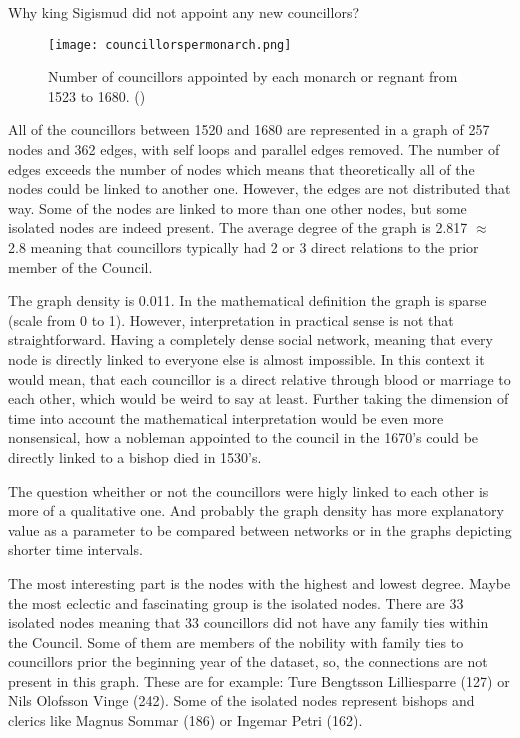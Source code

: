 Why king Sigismud did not appoint any new councillors? 

\begin{figure}
	\texttt{[image: councillorspermonarch.png]}
	\centering
	\caption[Number of councillors appointed by each ruler between 1523-1680] {Number of councillors appointed by each monarch or regnant from 1523 to 1680. (\cite{councillorsDS})} 
	\centering
\end{figure}

All of the councillors between 1520 and 1680 are represented in a graph of 257 nodes and 362 edges, with self loops and parallel edges removed. The number of edges exceeds the number of nodes which means that theoretically all of the nodes could be linked to another one. However, the edges are not distributed that way. Some of the nodes are linked to more than one other nodes, but some isolated nodes are indeed present. The average degree of the graph is 2.817 $\approx$ 2.8 meaning that councillors typically had 2 or 3 direct relations to the prior member of the Council.

The graph density is 0.011. In the mathematical definition the graph is sparse (scale from 0 to 1). However, interpretation in practical sense is not that straightforward. Having a completely dense social network, meaning that every node is directly linked to everyone else is almost impossible. In this context it would mean, that each councillor is a direct relative through blood or marriage to each other, which would be weird to say at least. Further taking the dimension of time into account the mathematical interpretation would be even more nonsensical, how a nobleman appointed to the council in the 1670's could be directly linked to a bishop died in 1530's. 

The question wheither or not the councillors were higly linked to each other is more of a qualitative one. And probably the graph density has more explanatory value as a parameter to be compared between networks or in the graphs depicting shorter time intervals. 

The most interesting part is the nodes with the highest and lowest degree. Maybe the most eclectic and fascinating group is the isolated nodes. There are 33 isolated nodes meaning that 33 councillors did not have any family ties within the Council. Some of them are members of the nobility with family ties to councillors prior the beginning year of the dataset, so, the connections are not present in this graph. These are for example: Ture Bengtsson Lilliesparre (127) or Nils Olofsson Vinge (242). Some of the isolated nodes represent bishops and clerics like Magnus Sommar (186) or Ingemar Petri (162). 

